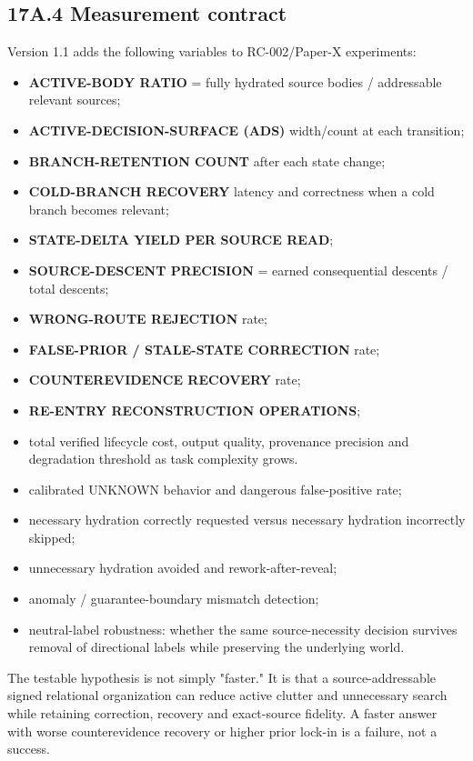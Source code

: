 \documentclass[
  10pt,
  letterpaper,
]{article}
\providecommand{\tightlist}{%
  \setlength{\itemsep}{0pt}\setlength{\parskip}{0pt}}
\begin{document}
\subsection{17A.4 Measurement contract}\label{17a4-measurement-contract}

Version 1.1 adds the following variables to RC-002/Paper-X experiments:

\begin{itemize}
\tightlist
\item
  \textbf{ACTIVE-BODY RATIO} = fully hydrated source bodies /
  addressable relevant sources;
\item
  \textbf{ACTIVE-DECISION-SURFACE (ADS)} width/count at each transition;
\item
  \textbf{BRANCH-RETENTION COUNT} after each state change;
\item
  \textbf{COLD-BRANCH RECOVERY} latency and correctness when a cold
  branch becomes relevant;
\item
  \textbf{STATE-DELTA YIELD PER SOURCE READ};
\item
  \textbf{SOURCE-DESCENT PRECISION} = earned consequential descents /
  total descents;
\item
  \textbf{WRONG-ROUTE REJECTION} rate;
\item
  \textbf{FALSE-PRIOR / STALE-STATE CORRECTION} rate;
\item
  \textbf{COUNTEREVIDENCE RECOVERY} rate;
\item
  \textbf{RE-ENTRY RECONSTRUCTION OPERATIONS};
\item
  total verified lifecycle cost, output quality, provenance precision
  and degradation threshold as task complexity grows.
\item
  calibrated UNKNOWN behavior and dangerous false-positive rate;
\item
  necessary hydration correctly requested versus necessary hydration
  incorrectly skipped;
\item
  unnecessary hydration avoided and rework-after-reveal;
\item
  anomaly / guarantee-boundary mismatch detection;
\item
  neutral-label robustness: whether the same source-necessity decision
  survives removal of directional labels while preserving the underlying
  world.
\end{itemize}

The testable hypothesis is not simply "faster." It is that a
source-addressable signed relational organization can reduce active
clutter and unnecessary search while retaining correction, recovery and
exact-source fidelity. A faster answer with worse counterevidence
recovery or higher prior lock-in is a failure, not a success.
\end{document}
